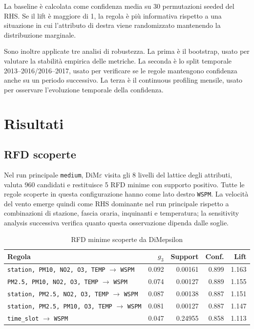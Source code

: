 \documentclass[a4paper,12pt]{article}
\newcommand{\Dime}{DiM\ensuremath{\varepsilon}}
\newcommand{\Wspm}{\texttt{WSPM}}
\newcommand{\TimeSlot}{\texttt{time\_slot}}
\begin{document}
La baseline è calcolata come confidenza media su 30 permutazioni seeded del RHS. Se il lift è maggiore di 1, la regola è più informativa rispetto a una situazione in cui l'attributo di destra viene randomizzato mantenendo la distribuzione marginale.

Sono inoltre applicate tre analisi di robustezza. La prima è il bootstrap, usato per valutare la stabilità empirica delle metriche. La seconda è lo split temporale 2013--2016/2016--2017, usato per verificare se le regole mantengono confidenza anche su un periodo successivo. La terza è il continuous profiling mensile, usato per osservare l'evoluzione temporale della confidenza.

\section{Risultati}

\subsection{RFD scoperte}

Nel run principale \texttt{medium}, \Dime{} visita gli 8 livelli del lattice degli attributi, valuta 960 candidati e restituisce 5 RFD minime con supporto positivo. Tutte le regole scoperte in questa configurazione hanno come lato destro \Wspm. La velocità del vento emerge quindi come RHS dominante nel run principale rispetto a combinazioni di stazione, fascia oraria, inquinanti e temperatura; la sensitivity analysis successiva verifica quanto questa osservazione dipenda dalle soglie.

\begin{table}[H]
\centering
\caption{RFD minime scoperte da DiMepsilon}
\label{tab:dime}
\small
\begin{tabularx}{\textwidth}{>{\raggedright\arraybackslash}X r r r r}
\toprule
Regola & $g_3$ & Support & Conf. & Lift \\
\midrule
\texttt{station, PM10, NO2, O3, TEMP} $\rightarrow$ \texttt{WSPM}
& 0.092 & 0.00161 & 0.899 & 1.163 \\
\texttt{PM2.5, PM10, NO2, O3, TEMP} $\rightarrow$ \texttt{WSPM}
& 0.074 & 0.00127 & 0.889 & 1.155 \\
\texttt{station, PM2.5, NO2, O3, TEMP} $\rightarrow$ \texttt{WSPM}
& 0.087 & 0.00138 & 0.887 & 1.151 \\
\texttt{station, PM2.5, PM10, O3, TEMP} $\rightarrow$ \texttt{WSPM}
& 0.081 & 0.00127 & 0.887 & 1.147 \\
\TimeSlot{} $\rightarrow$ \texttt{WSPM}
& 0.047 & 0.24955 & 0.858 & 1.113 \\
\bottomrule
\end{tabularx}
\end{table}
\end{document}
